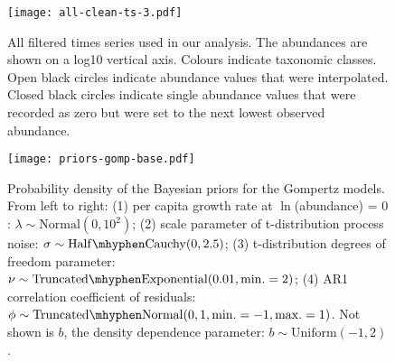 \renewcommand{\thefigure}{S\arabic{figure}}
\setcounter{figure}{0}


\begin{figure}[htbp]
\begin{center}
\texttt{[image: all-clean-ts-3.pdf]} \caption{All filtered times series used in our analysis. The abundances are shown on a log10 vertical axis. Colours indicate taxonomic classes. Open black circles indicate abundance values that were interpolated. Closed black circles indicate single abundance values that were recorded as zero but were set to the next lowest observed abundance.}
    \label{fig:all-ts}
\end{center}
\end{figure}

\clearpage

\begin{figure}[htbp]
\begin{center}
\texttt{[image: priors-gomp-base.pdf]} \caption{Probability
  density of the Bayesian priors for the Gompertz models. From left to right: (1) per capita growth
  rate at $\ln$(abundance) = $0$: $\lambda \sim \mathrm{Normal}(0, 10^2)$; (2) scale
  parameter of t-distribution process noise: $\sigma \sim \mathrm{Half\mhyphen
    Cauchy} (0, 2.5)$; (3) t-distribution degrees of freedom parameter: $\nu \sim
  \mathrm{Truncated\mhyphen Exponential}(0.01, \mathrm{min.} = 2)$; (4) AR1 correlation coefficient of residuals: $\phi \sim \mathrm{Truncated \mhyphen Normal}(0, 1, \mathrm{min.} = -1, \mathrm{max.} = 1)$. Not shown is $b$, the density dependence parameter: $b \sim \mathrm{Uniform}(-1, 2)$.}
  \label{fig:priors}
\end{center}
\end{figure}

\clearpage

